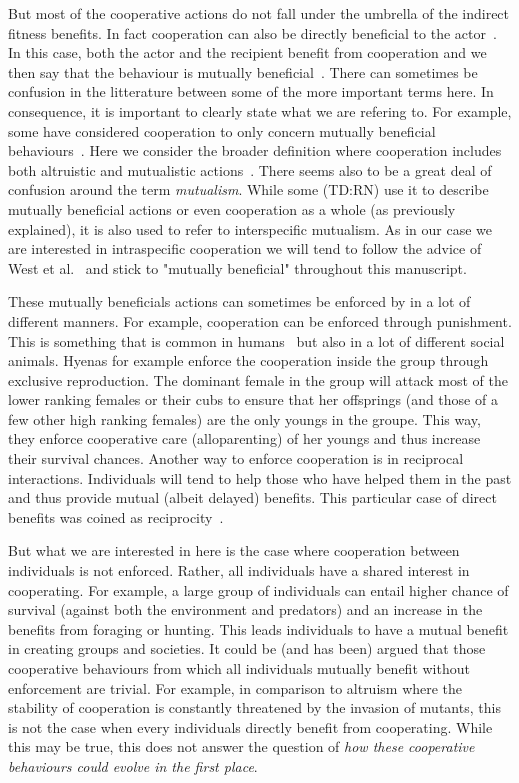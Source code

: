     But most of the cooperative actions do not fall under the umbrella of the indirect fitness benefits. In fact cooperation can also be directly beneficial to the actor~\cite{Leimar2010}. In this case, both the actor and the recipient benefit from cooperation and we then say that the behaviour is mutually beneficial~\cite{West2006}. There can sometimes be confusion in the litterature between some of the more important terms here. In consequence, it is important to clearly state what we are refering to. For example, some have considered cooperation to only concern mutually beneficial behaviours~\cite{Trivers1985, Keller2006}. Here we consider the broader definition where cooperation includes both altruistic and mutualistic actions~\cite{West2006}. There seems also to be a great deal of confusion around the term \emph{mutualism}. While some (TD:RN) use it to describe mutually beneficial actions or even cooperation as a whole (as previously explained), it is also used to refer to interspecific mutualism. As in our case we are interested in intraspecific cooperation we will tend to follow the advice of West et al.~\cite{West2006} and stick to "mutually beneficial" throughout this manuscript.

    These mutually beneficials actions can sometimes be enforced by in a lot of different manners. For example, cooperation can be enforced through punishment. This is something that is common in humans~\cite{Fehr2002} but also in a lot of different social animals. Hyenas for example enforce the cooperation inside the group through exclusive reproduction. The dominant female in the group will attack most of the lower ranking females or their cubs to ensure that her offsprings (and those of a few other high ranking females) are the only youngs in the groupe. This way, they enforce cooperative care (alloparenting) of her youngs and thus increase their survival chances. Another way to enforce cooperation is in reciprocal interactions. Individuals will tend to help those who have helped them in the past and thus provide mutual (albeit delayed) benefits. This particular case of direct benefits was coined as reciprocity~\cite{Trivers1971, Keller2006}.


    But what we are interested in here is the case where cooperation between individuals is not enforced. Rather, all individuals have a shared interest in cooperating. For example, a large group of individuals can entail higher chance of survival (against both the environment and predators) and an increase in the benefits from foraging or hunting. This leads individuals to have a mutual benefit in creating groups and societies. It could be (and has been) argued that those cooperative behaviours from which all individuals mutually benefit without enforcement are trivial. For example, in comparison to altruism where the stability of cooperation is constantly threatened by the invasion of mutants, this is not the case when every individuals directly benefit from cooperating. While this may be true, this does not answer the question of \emph{how these cooperative behaviours could evolve in the first place}.

